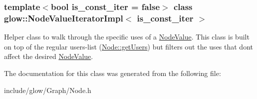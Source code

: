 \subsubsection*{template$<$bool is\+\_\+const\+\_\+iter = false$>$\newline
class glow\+::\+Node\+Value\+Iterator\+Impl$<$ is\+\_\+const\+\_\+iter $>$}

Helper class to walk through the specific uses of a \hyperlink{structglow_1_1_node_value}{Node\+Value}. This class is built on top of the regular users-\/list (\hyperlink{classglow_1_1_use_def_a36287064b16f4c2569988d2b795cd9b7}{Node\+::get\+Users}) but filters out the uses that don\textquotesingle{}t affect the desired \hyperlink{structglow_1_1_node_value}{Node\+Value}. 

The documentation for this class was generated from the following file\+:\begin{DoxyCompactItemize}
\item 
include/glow/\+Graph/Node.\+h\end{DoxyCompactItemize}
